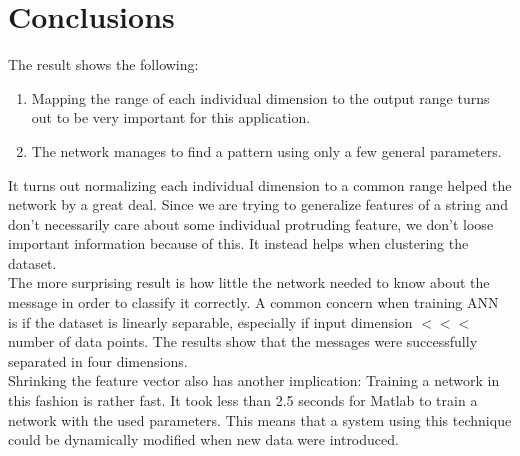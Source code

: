 
\section{Conclusions}

The result shows the following:
\begin{enumerate}
  \item Mapping the range of each individual dimension to
    the output range turns out to be very important for this application.
  \item The network manages to find a pattern using only a few general
    parameters. 
\end{enumerate}

It turns out normalizing each individual dimension to a common range helped the
network by a great deal. Since we are trying to generalize features of a
string and don't necessarily care about some individual protruding feature, we
don't loose important information because of this. It instead helps when
clustering the dataset.
\\ 
The more surprising result is how little the network needed to know about the
message in order to classify it correctly. A common concern when training ANN
is if the dataset is linearly separable, especially if input dimension $<<<$
number of data points. The results show that the messages were successfully
separated in four dimensions.
\\ 
Shrinking the feature vector also has another implication: Training a network
in this fashion is rather fast. It took less than 2.5 seconds for Matlab to
train a network with the used parameters. This means that a system using this
technique could be dynamically modified when new data were introduced. 


